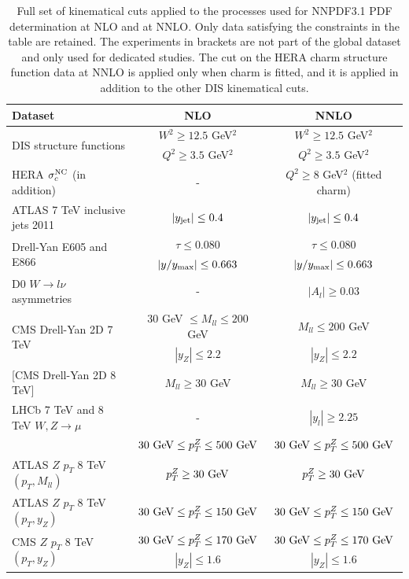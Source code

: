 
\begin{table}[t]
  \begin{center}
    \footnotesize
    \renewcommand{\arraystretch}{1.7}
    \begin{tabular}{|l|c|c|}
\hline
Dataset & NLO & NNLO \\
\hline
\hline
\multirow{2}{*}{DIS structure functions}  & $W^2\ge 12.5$ GeV$^2$ & $W^2\ge 12.5$ GeV$^2$ \\
& $Q^2\ge 3.5$ GeV$^2$ & $Q^2\ge 3.5$ GeV$^2$ \\
\hline
HERA $\sigma_c^{\rm NC}$ (in addition)  &  - &   $Q^2 \ge 8$ GeV$^2$ (fitted charm) \\
\hline
\hline
ATLAS 7 TeV inclusive jets 2011  & $|y_{\rm jet}|\le 0.4 $ &
$|y_{\rm jet}|\le 0.4 $ \\
\hline
\hline
\multirow{2}{*}{Drell-Yan E605 and E866}  & $\tau \le 0.080$ &  $\tau \le 0.080$ \\
& $|y/y_{\rm max}|\le 0.663$ &  $|y/y_{\rm max}|\le 0.663$  \\
\hline
D0 $W \to l\nu$ asymmetries  & - & $|A_{l}|\ge 0.03 $ \\
\hline
\multirow{2}{*}{CMS Drell-Yan 2D 7 TeV}
& 30 GeV $\le M_{ll}\le 200$ GeV &  $ M_{ll}\le 200$ GeV   \\
&  $|y_Z|\le 2.2$  &  $|y_Z|\le 2.2$  \\
\hline
\multirow{1}{*}{[CMS Drell-Yan 2D  8 TeV]}   &  $ M_{ll}\ge 30$ GeV &  $ M_{ll}\ge 30$ GeV   \\
\hline
LHCb 7 TeV and 8 TeV $W,Z\to \mu$  & - & $|y_{l}|\ge 2.25 $ \\
\hline
\hline
[ATLAS $Z$ $p_T$ 7 TeV]   & $30~{\rm GeV}\le p_T^Z \le 500~{\rm GeV}$ &
$30~{\rm GeV}\le p_T^Z \le 500~{\rm GeV}$ \\
\hline
ATLAS $Z$ $p_T$ 8 TeV $(p_T,M_{ll})$    & $ p_T^Z\ge30~{\rm GeV}$ &
$ p_T^Z\ge30~{\rm GeV}$ \\
\hline
ATLAS $Z$ $p_T$ 8 TeV $(p_T,y_{Z})$    & $30~{\rm GeV}\le p_T^Z \le 150~{\rm GeV}$ &
$30~{\rm GeV}\le p_T^Z \le 150~{\rm GeV}$ \\
\hline
\multirow{2}{*}{CMS $Z$ $p_T$ 8 TeV $(p_T,y_{Z})$}   & $30~{\rm GeV}\le p_T^Z \le 170~{\rm GeV}$ &
$30~{\rm GeV}\le p_T^Z \le 170~{\rm GeV}$ \\
& $|y_Z| \le 1.6$ &   $|y_Z| \le 1.6$ \\
\hline
    \end{tabular}
    \caption{\small 
Full set of kinematical cuts applied to the
      processes
      used for  NNPDF3.1 PDF determination at NLO and at NNLO.
     Only data satisfying the constraints in the table are retained.
      The experiments in brackets are not part of the global dataset and only
      used for dedicated studies.
      The cut on the HERA charm structure function data at NNLO
      is applied only when charm is fitted, and it is applied
      in addition to the other DIS kinematical cuts.
      \label{eq:tablekincuts}
}
\end{center}
\end{table}
  



